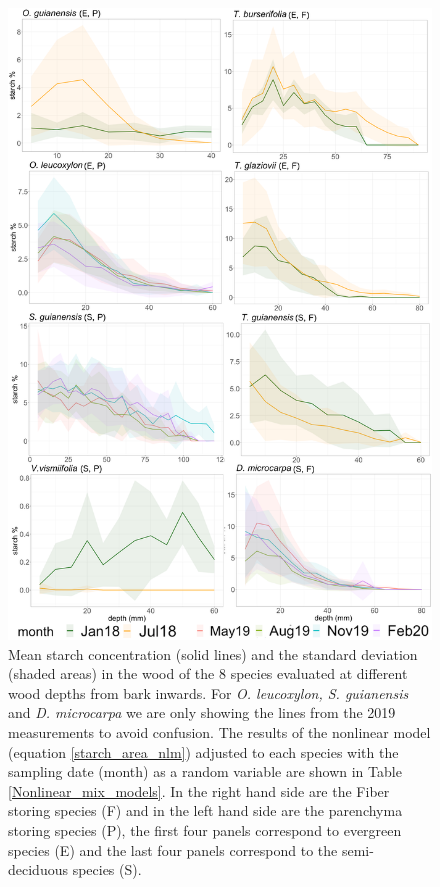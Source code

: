 \documentclass{article}
\begin{document}
 \begin{figure}[p] %
   \centering
   \includegraphics[width=4.5in]{Fig1_radial_concentration_starch.png} 
   \caption{Mean starch concentration (solid lines) and the standard deviation (shaded areas) in the wood of the 8 species evaluated at different wood depths from bark inwards. For \textit{O. leucoxylon, S. guianensis} and \textit{D. microcarpa} we are only showing the lines from the 2019 measurements to avoid confusion. The results of the nonlinear model (equation \ref{starch_area_nlm}) adjusted to each species with the sampling date (month) as a random variable are shown in Table \ref{Nonlinear_mix_models}. In the right hand side are the Fiber storing species (F) and in the left hand side are the parenchyma storing species (P), the first four panels correspond to evergreen species (E) and the last four panels correspond to the semi-deciduous species (S).}
   \label{fig:starch_radial_pattern}
\end{figure}
 
\end{document}
